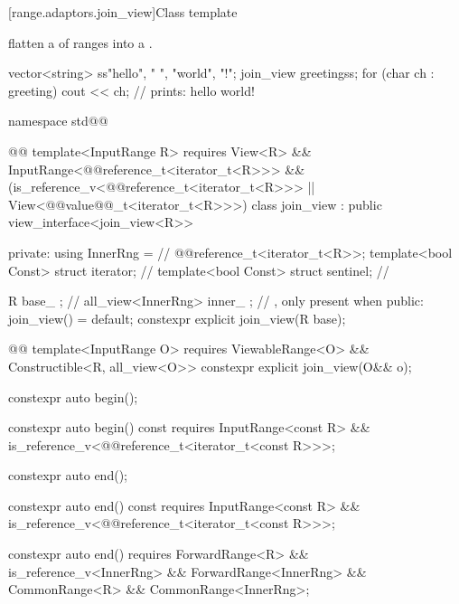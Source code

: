 {[range.adaptors.join_view]{Class template }

\pnum
{}   flatten a
 of ranges into a
.

\pnum
\begin{example}
\begin{codeblock}
vector<string> ss{"hello", " ", "world", "!"};
join_view greeting{ss};
for (char ch : greeting)
  cout << ch; // prints: hello world!
\end{codeblock}
\end{example}

\begin{codeblock}
namespace std@@ { @@
  template<InputRange R>
    requires View<R> && InputRange<@@reference_t<iterator_t<R>>> &&
      (is_reference_v<@@reference_t<iterator_t<R>>> ||
      View<@@value@@_t<iterator_t<R>>>)
  class join_view : public view_interface<join_view<R>> {
  private:
    using InnerRng =              // \expos
      @@reference_t<iterator_t<R>>;
    template<bool Const>
      struct iterator;            // \expos
    template<bool Const>
      struct sentinel;            // \expos

    R base_ {};                   // \expos
    all_view<InnerRng> inner_ {}; // \expos, only present when 
  public:
    join_view() = default;
    constexpr explicit join_view(R base);

    @@
    template<InputRange O>
        requires ViewableRange<O> && Constructible<R, all_view<O>>
      constexpr explicit join_view(O&& o);

    constexpr auto begin();

    constexpr auto begin() const requires InputRange<const R> &&
      is_reference_v<@@reference_t<iterator_t<const R>>>;

    constexpr auto end();

    constexpr auto end() const requires InputRange<const R> &&
      is_reference_v<@@reference_t<iterator_t<const R>>>;

    constexpr auto end() requires ForwardRange<R> &&
      is_reference_v<InnerRng> && ForwardRange<InnerRng> &&
      CommonRange<R> && CommonRange<InnerRng>;

}}
\end{codeblock}}
